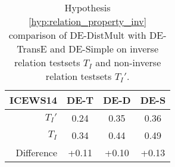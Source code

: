 \begin{table}[htb]
\centering
\begin{minipage}{0.95\columnwidth}
\centering
\caption{Hypothesis \autoref{hyp:relation_property_inv} comparison of DE-DistMult with DE-TransE and DE-Simple on inverse relation testsets $T_I$ and non-inverse relation testsets $T_I'$.}
\vspace{-3mm}

\begin{tabular}{r|ccc}\hline
ICEWS14 & DE-T & DE-D & DE-S \\ \hline
$T_I'$ & 0.24 & 0.35 & 0.36 \\
$T_I$ & 0.34 & 0.44 & 0.49 \\ \hline
Difference & +0.11 & +0.10 & +0.13 \\
 \hline
\end{tabular}

\label{tab:hypothesis_3_c_comparison}
\end{minipage}
\end{table}

